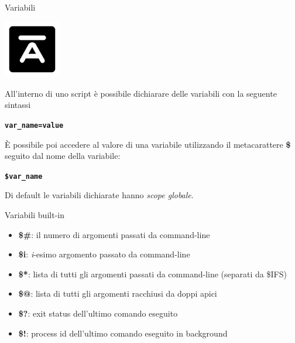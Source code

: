 \documentclass{beamer}
\begin{document}
    \begin{frame}{Variabili}
        \begin{center}
            \includegraphics[height=2.5cm, keepaspectratio]{images/variables.pdf}
        \end{center}

        All'interno di uno script è possibile dichiarare delle variabili con la seguente sintassi

        \begin{center}
            \texttt{\textbf{var\_name=value}}
        \end{center}

        È possibile poi accedere al valore di una variabile utilizzando il metacarattere \textbf{\$}
        seguito dal nome della variabile:

        \begin{center}
            \texttt{\textbf{\$var\_name}}
        \end{center}

        Di default le variabili dichiarate hanno \textit{scope globale}.
    \end{frame}

    \begin{frame}{Variabili built-in}
        \begin{itemize}
            \item \textbf{\$\#}: il numero di argomenti passati da command-line \\ \vspace{0.5cm}
            \item \textbf{\$i}: \textit{i}-esimo argomento passato da command-line \\ \vspace{0.5cm}
            \item \textbf{\$*}: lista di tutti gli argomenti passati da command-line (separati da \$IFS) \\ \vspace{0.5cm}
            \item \textbf{\$@}: lista di tutti gli argomenti racchiusi da doppi apici \\ \vspace{0.5cm}
            \item \textbf{\$?}: exit status dell'ultimo comando eseguito \\ \vspace{0.5cm}
            \item \textbf{\$!}: process id dell'ultimo comando eseguito in background
        \end{itemize}
    \end{frame}
\end{document}
